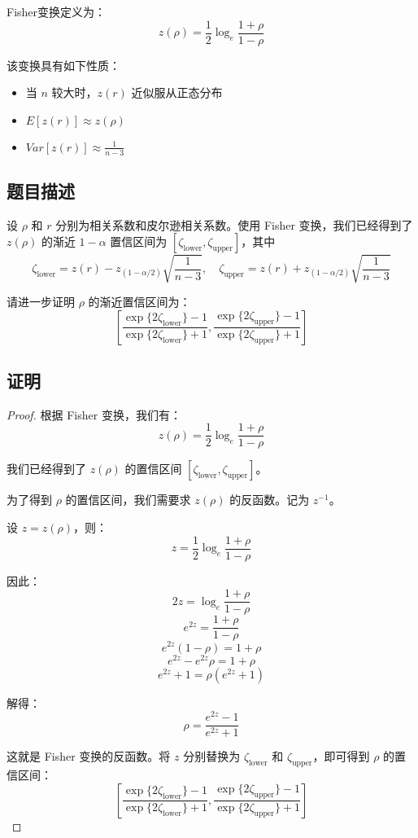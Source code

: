 \documentclass[UTF8]{report}
\theoremstyle{MyLineTheoremStyle} %
\theoremstyle{MyBlockTheoremStyle} %
\theoremstyle{MySubsubsectionStyle} %
\begin{document}
Fisher变换定义为：
\[ z(\rho) = \frac{1}{2} \log_e \frac{1+\rho}{1-\rho} \]

该变换具有如下性质：
\begin{itemize}
    \item 当 $n$ 较大时，$z(r)$ 近似服从正态分布
    \item $E[z(r)] \approx z(\rho)$
    \item $Var[z(r)] \approx \frac{1}{n-3}$
\end{itemize}

\subsection*{题目描述}

设 $\rho$ 和 $r$ 分别为相关系数和皮尔逊相关系数。使用 Fisher 变换，我们已经得到了 $z(\rho)$ 的渐近 $1 - \alpha$ 置信区间为 $[\zeta_{\text{lower}}, \zeta_{\text{upper}}]$，其中
\[ \zeta_{\text{lower}} = z(r) - z_{(1-\alpha/2)}\sqrt{\frac{1}{n-3}}, \quad \zeta_{\text{upper}} = z(r) + z_{(1-\alpha/2)}\sqrt{\frac{1}{n-3}} \]

请进一步证明 $\rho$ 的渐近置信区间为：
\[ \left[ \frac{\exp\{2 \zeta_{\text{lower}}\} - 1}{\exp\{2 \zeta_{\text{lower}}\} + 1}, \frac{\exp\{2 \zeta_{\text{upper}}\} - 1}{\exp\{2 \zeta_{\text{upper}}\} + 1} \right] \]

\subsection*{证明}

\begin{proof}
根据 Fisher 变换，我们有：
\[ z(\rho) = \frac{1}{2} \log_e \frac{1+\rho}{1-\rho} \]

我们已经得到了 $z(\rho)$ 的置信区间 $[\zeta_{\text{lower}}, \zeta_{\text{upper}}]$。

为了得到 $\rho$ 的置信区间，我们需要求 $z(\rho)$ 的反函数。记为 $z^{-1}$。

设 $z = z(\rho)$，则：
\[ z = \frac{1}{2} \log_e \frac{1+\rho}{1-\rho} \]

因此：
\[ 2z = \log_e \frac{1+\rho}{1-\rho} \]
\[ e^{2z} = \frac{1+\rho}{1-\rho} \]
\[ e^{2z}(1-\rho) = 1+\rho \]
\[ e^{2z} - e^{2z}\rho = 1 + \rho \]
\[ e^{2z} + 1 = \rho(e^{2z} + 1) \]

解得：
\[ \rho = \frac{e^{2z} - 1}{e^{2z} + 1} \]

这就是 Fisher 变换的反函数。将 $z$ 分别替换为 $\zeta_{\text{lower}}$ 和 $\zeta_{\text{upper}}$，即可得到 $\rho$ 的置信区间：
\[ \left[ \frac{\exp\{2 \zeta_{\text{lower}}\} - 1}{\exp\{2 \zeta_{\text{lower}}\} + 1}, \frac{\exp\{2 \zeta_{\text{upper}}\} - 1}{\exp\{2 \zeta_{\text{upper}}\} + 1} \right] \]
\end{proof}
\end{document}
